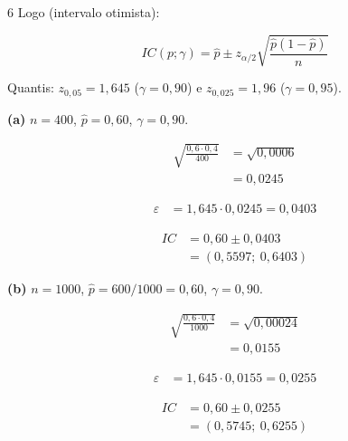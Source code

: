 \documentclass[8pt, a4paper, landscape]{extarticle}
\begin{document}
\begin{multicols}{6}
Logo (intervalo otimista):

\begin{equation*}
IC(p;\gamma) = \hat{p} \pm z_{\alpha/2}\sqrt{\frac{\hat{p}(1-\hat{p})}{n}}
\end{equation*}

Quantis: $z_{0,05} = 1,645$ ($\gamma = 0,90$) e $z_{0,025} = 1,96$ ($\gamma = 0,95$).

\vspace{0.2cm}

\textbf{(a)} $n = 400$, $\hat{p} = 0,60$, $\gamma = 0,90$.

\begin{equation*}
\begin{split}
\sqrt{\frac{0,6 \cdot 0,4}{400}} &= \sqrt{0,0006} \\
&= 0,0245
\end{split}
\end{equation*}

\begin{equation*}
\begin{split}
\varepsilon &= 1,645 \cdot 0,0245 = 0,0403
\end{split}
\end{equation*}

\begin{equation*}
\begin{split}
IC &= 0,60 \pm 0,0403 \\
&= (0,5597;\ 0,6403)
\end{split}
\end{equation*}

\vspace{0.2cm}

\textbf{(b)} $n = 1000$, $\hat{p} = 600/1000 = 0,60$, $\gamma = 0,90$.

\begin{equation*}
\begin{split}
\sqrt{\frac{0,6 \cdot 0,4}{1000}} &= \sqrt{0,00024} \\
&= 0,0155
\end{split}
\end{equation*}

\begin{equation*}
\begin{split}
\varepsilon &= 1,645 \cdot 0,0155 = 0,0255
\end{split}
\end{equation*}

\begin{equation*}
\begin{split}
IC &= 0,60 \pm 0,0255 \\
&= (0,5745;\ 0,6255)
\end{split}
\end{equation*}


\end{multicols}
\end{document}

